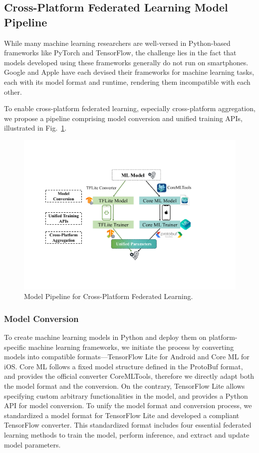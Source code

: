 \subsection{Cross-Platform Federated Learning Model Pipeline}
\label{sec:pipeline}

While many machine learning researchers are well-versed in Python-based
frameworks like PyTorch and TensorFlow,
the challenge lies in the fact that models developed using these frameworks
generally do not run on smartphones.
Google and Apple have each devised their frameworks for machine learning tasks,
each with its model format and runtime,
rendering them incompatible with each other.

To enable cross-platform federated learning,
especially cross-platform aggregation,
we propose a pipeline comprising model conversion and unified training APIs,
illustrated in Fig.~\ref{fig:pipeline}.

\begin{figure}\begin{center}
        \includegraphics[width=\linewidth]{model_pipeline.pdf}
        \caption{\fedkit Model Pipeline for Cross-Platform Federated Learning.}
        \label{fig:pipeline}
    \end{center}\end{figure}

\subsubsection{Model Conversion}
To create machine learning models in Python and deploy them on platform-specific
machine learning frameworks,
we initiate the process by converting models into compatible
formats---TensorFlow Lite for Android and Core ML for iOS.
Core ML follows a fixed model structure defined in the ProtoBuf format,
and provides the official converter CoreMLTools,
therefore we directly adapt both the model format and the conversion.
On the contrary,
TensorFlow Lite allows specifying custom arbitrary functionalities in the model,
and provides a Python API for model conversion.
To unify the model format and conversion process,
we standardized a model format for TensorFlow Lite and developed a compliant
TensorFlow converter.
This standardized format includes four essential federated learning methods to
train the model, perform inference, and extract and update model parameters.

